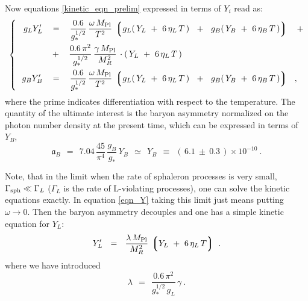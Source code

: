\documentclass[12pt]{revtex4}
\newcommand{\lgr}{\left\lgroup}
\newcommand{\rgr}{\right\rgroup}
\newcommand{\Mpl}{M_{\rm Pl}}
\newcommand{\Gsph}{\Gamma_{\rm sph}}
\begin{document}
	Now equations \eqref{kinetic_eqn_prelim} expressed in terms of
	$ Y_i $ read as:
\begin{equation}
\label{eqn_Y}
\left\{~~
\begin{split}
	g_L Y_L' 
	& ~~\;=~~\;
	\frac{0.6}{g_*^{1/2}}\, 
	\frac{\omega\,\Mpl}{T^2}\,
	\lgr g_L (\,Y_L~+~6\,\eta_L\,T\,) ~~+~~ 
	     g_B (\,Y_B~+~6\,\eta_B\,T\,)  \rgr 
	\;~~+
	\\
	& \;~~+~~\;  
	\frac{0.6\,\pi^2}{g_*^{1/2}}\, 
	\frac{\gamma\,\Mpl}{M_R^2}\,
	\cdot (\, Y_L ~+~ 6\,\eta_L\,T\,)\\
	g_B Y_B' 
	& ~~\;=~~\;
	\frac{0.6}{g_*^{1/2}}\, 
	\frac{\omega\,\Mpl}{T^2}\,
	\lgr g_L (\,Y_L~+~6\,\eta_L\,T\,) ~~+~~ 
	     g_B (\,Y_B~+~6\,\eta_B\,T\,)  \rgr 
	~~,
\end{split}
\right.
\end{equation}
	where the prime indicates differentiation with respect to
	the temperature.
	The quantity of the ultimate interest is the baryon asymmetry 
	normalized on the
	photon number density at the present time, which can be expressed
	in terms of $ Y_B $,
\begin{equation}
\label{def_asy}
	\mathfrak{a}_B ~~=~~ 7.04\, \frac{45}{\pi^4}\, \frac{g_B}{g_*}\, Y_B
	~~\simeq~~ Y_B 
		~~\equiv~~ (\, 6.1 ~\pm~ 0.3 \,)\times 10^{-10}~.
\end{equation}


	Note, that in the limit when the rate of sphaleron processes
	is very small, $ \Gsph \ll \Gamma_L $ ($ \Gamma_L $ is the rate
	of L-violating processes), one can solve the kinetic equations
	exactly. 
	In equation \eqref{eqn_Y} taking this limit just means 
	putting $ \omega \to 0 $.
	Then the baryon asymmetry decouples and one has a simple 
	kinetic equation for $ Y_L $:
\begin{equation}
\label{btz_simple}
	Y_L' ~~=~~ \frac{\lambda\,\Mpl}{M_R^2} \,
			\lgr Y_L ~+~ 6\,\eta_L\, T \rgr~.
\end{equation}
	where we have introduced
\[
	\lambda ~~=~~ \frac{0.6\, \pi^2}
    		         {g_*^{1/2}\, g_L}\,\gamma~.
\]
	
\end{document}
